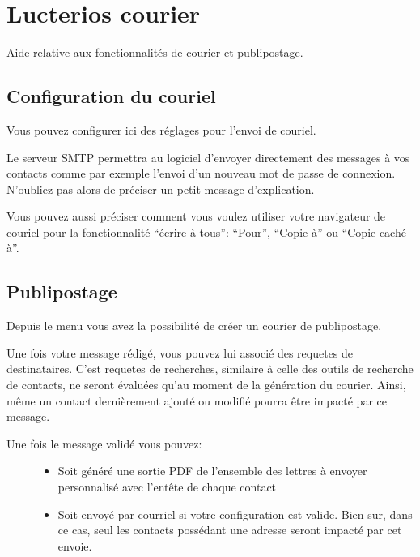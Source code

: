 \documentclass[letterpaper,10pt,french]{sphinxmanual}
\begin{document}
\chapter{Lucterios courier}
\label{\detokenize{mailing/index::doc}}\label{\detokenize{mailing/index:lucterios-courier}}
Aide relative aux fonctionnalités de courier et publipostage.


\section{Configuration du couriel}
\label{\detokenize{mailing/configuration:configuration-du-couriel}}\label{\detokenize{mailing/configuration::doc}}
Vous pouvez configurer ici des réglages pour l’envoi de couriel.

Le serveur SMTP permettra au logiciel d’envoyer directement des messages à vos contacts comme par exemple l’envoi d’un nouveau mot de passe de connexion. N’oubliez pas alors de préciser un petit message d’explication.

Vous pouvez aussi préciser comment vous voulez utiliser votre navigateur de couriel pour la fonctionnalité “écrire à tous”: “Pour”, “Copie à” ou “Copie caché à”.


\section{Publipostage}
\label{\detokenize{mailing/mailing:publipostage}}\label{\detokenize{mailing/mailing::doc}}
Depuis le menu  vous avez la possibilité de créer un courier de publipostage.

Une fois votre message rédigé, vous pouvez lui associé des requetes de destinataires.
C’est requetes de recherches, similaire à celle des outils de recherche de contacts, ne seront évaluées qu’au moment de la génération du courier.
Ainsi, même un contact dernièrement ajouté ou modifié pourra être impacté par ce message.

\noindent{}
\begin{description}
\item[{Une fois le message validé vous pouvez:}] \leavevmode\begin{itemize}
\item {} 
Soit généré une sortie PDF de l’ensemble des lettres à envoyer personnalisé avec l’entête de chaque contact

\item {} 
Soit envoyé par courriel si votre configuration est valide. Bien sur, dans ce cas, seul les contacts possédant une adresse seront impacté par cet envoie.

\end{itemize}

\end{description}
\end{document}
